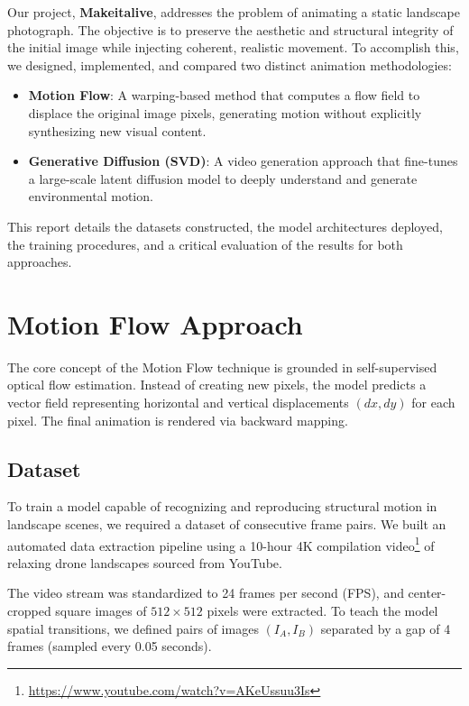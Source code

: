\documentclass[10pt,twocolumn,letterpaper]{article}
\begin{document}
Our project, \textbf{Makeitalive}, addresses the problem of animating a static landscape photograph. The objective is to preserve the aesthetic and structural integrity of the initial image while injecting coherent, realistic movement. To accomplish this, we designed, implemented, and compared two distinct animation methodologies:
\begin{itemize}
    \item \textbf{Motion Flow}: A warping-based method that computes a flow field to displace the original image pixels, generating motion without explicitly synthesizing new visual content.
    \item \textbf{Generative Diffusion (SVD)}: A video generation approach that fine-tunes a large-scale latent diffusion model to deeply understand and generate environmental motion.
\end{itemize}

This report details the datasets constructed, the model architectures deployed, the training procedures, and a critical evaluation of the results for both approaches.

\section{Motion Flow Approach}

The core concept of the Motion Flow technique is grounded in self-supervised optical flow estimation. Instead of creating new pixels, the model predicts a vector field representing horizontal and vertical displacements $(dx, dy)$ for each pixel. The final animation is rendered via backward mapping.

\subsection{Dataset}

To train a model capable of recognizing and reproducing structural motion in landscape scenes, we required a dataset of consecutive frame pairs. We built an automated data extraction pipeline using a 10-hour 4K compilation video\footnote{\url{https://www.youtube.com/watch?v=AKeUssuu3Is}} of relaxing drone landscapes sourced from YouTube. 

The video stream was standardized to 24 frames per second (FPS), and center-cropped square images of $512 \times 512$ pixels were extracted. To teach the model spatial transitions, we defined pairs of images $(I_A, I_B)$ separated by a gap of 4 frames (sampled every 0.05 seconds). 
\end{document}
